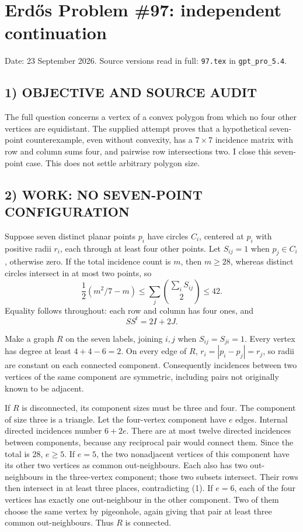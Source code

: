 \section{Erd\H{o}s Problem \#97: independent continuation}
\noindent Date: 23 September 2026. Source versions read in full: \texttt{97.tex} in \texttt{gpt\_pro\_5.4}.

\subsection*{1) OBJECTIVE AND SOURCE AUDIT}
The full question concerns a vertex of a convex polygon from which no four
other vertices are equidistant. The supplied attempt proves that a hypothetical
seven-point counterexample, even without convexity, has a $7\times7$ incidence
matrix with row and column sums four, and pairwise row intersections two.
I close this seven-point case. This does not settle arbitrary polygon size.

\subsection*{2) WORK: NO SEVEN-POINT CONFIGURATION}
Suppose seven distinct planar points $p_i$ have circles $C_i$, centered at
$p_i$ with positive radii $r_i$, each through at least four other points.
Let $S_{ij}=1$ when $p_j\in C_i$, otherwise zero. If the total incidence count
is $m$, then $m\ge28$, whereas distinct circles intersect in at most two points,
so
\[
 \frac12(m^2/7-m)\le\sum_j\binom{\sum_iS_{ij}}2\le42.
\]
Equality follows throughout: each row and column has four ones, and
\[
 SS^t=2I+2J. \tag{1}
\]

Make a graph $R$ on the seven labels, joining $i,j$ when
$S_{ij}=S_{ji}=1$. Every vertex has degree at least $4+4-6=2$.
On every edge of $R$, $r_i=|p_i-p_j|=r_j$, so radii are constant on
each connected component. Consequently incidences between two vertices
of the same component are symmetric, including pairs not originally
known to be adjacent.

If $R$ is disconnected, its component sizes must be three and four.
The component of size three is a triangle. Let the four-vertex component
have $e$ edges. Internal directed incidences number $6+2e$. There are at
most twelve directed incidences between components, because any reciprocal
pair would connect them. Since the total is 28, $e\ge5$.
If $e=5$, the two nonadjacent vertices of this component have its other two
vertices as common out-neighbours. Each also has two out-neighbours in
the three-vertex component; those two subsets intersect. Their rows then
intersect in at least three places, contradicting (1).
If $e=6$, each of the four vertices has exactly one out-neighbour in the
other component. Two of them choose the same vertex by pigeonhole, again
giving that pair at least three common out-neighbours. Thus $R$ is connected.

